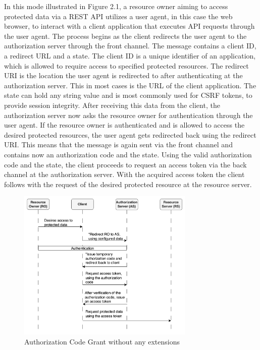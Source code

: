 \documentclass[
    fontsize=12pt,
    headings=small,
    parskip=half,           %
    bibliography=totoc,
    numbers=noenddot,       %
    open=any,               %
    ]{scrreprt}
\begin{document}
In this mode illustrated in Figure 2.1, a resource owner aiming to access protected data via a REST API utilizes a user agent, in this case the web browser, to interact with a client application that executes API requests through the user agent. The process begins as the client redirects the user agent to the authorization server through the front channel. The message contains a client ID, a redirect URL and a state. The client ID is a unique identifier of an application, which is allowed to require access to specified protected resources. The redirect URI is the location the user agent is redirected to after authenticating at the authorization server. This in most cases is the URL of the client application. The state can hold any string value and is most commonly used for CSRF tokens, to provide session integrity. After receiving this data from the client, the authorization server now asks the resource owner for authentication through the user agent. If the resource owner is authenticated and is allowed to access the desired protected resources, the user agent gets redirected back using the redirect URI. This means that the message is again sent via the front channel and contains now an authorization code and the state. Using the valid authorization code and the state, the client proceeds to request an access token via the back channel at the authorization server. With the acquired access token the client follows with the request of the desired protected resource at the resource server.

\begin{figure}[H]
	\sffamily\footnotesize
	\includegraphics[width=0.75\textwidth]{pic/authorization_code_grant.png}
	\unitlength=0.75mm
	\linethickness{0.4pt}
	\caption{Authorization Code Grant without any extensions}
	\label{fig:auth_code_grant}
\end{figure}
\end{document}
